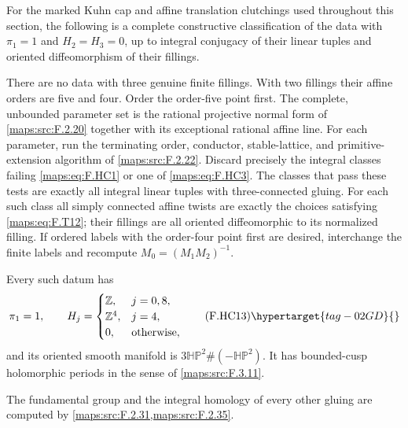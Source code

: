 \begin{corollary}\hypertarget{tag-02NL}{}\label{maps:src:F.2.30}


For the marked Kuhn cap and affine translation clutchings
used throughout this section, the following is a complete constructive
classification of the data with
$\pi_1=1$ and $H_2=H_3=0$, up to integral conjugacy of their
linear tuples and oriented diffeomorphism of their fillings.

There are no data with three genuine finite fillings.
With two fillings their affine orders are five and
four.  Order the order-five point first.
The complete, unbounded parameter set is the rational
projective normal form of \ref{maps:src:F.2.20} together with its
exceptional rational affine line.
For each parameter, run the terminating order,
conductor, stable-lattice, and primitive-extension algorithm
of \ref{maps:src:F.2.22}.  Discard precisely the integral classes failing
\eqref{maps:eq:F.HC1} or one of \eqref{maps:eq:F.HC3}.
The classes that pass these tests are exactly all
integral linear tuples with three-connected gluing.
For each such class all simply connected affine
twists are exactly the choices satisfying \eqref{maps:eq:F.T12};
their fillings are all oriented diffeomorphic to its
normalized filling.
If ordered labels with the order-four point first are
desired, interchange the finite labels and recompute
$M_0=(M_1M_2)^{-1}$.

Every such datum has
\[
 \pi_1=1,\qquad
 H_j=\begin{cases}
  \mathbb Z,&j=0,8,\\
  \mathbb Z^4,&j=4,\\
  0,&\text{otherwise},
 \end{cases}
 \tag{F.HC13}\hypertarget{tag-02GD}{}\label{maps:eq:F.HC13}
\]
and its oriented smooth manifold is
$3\mathbb{HP}^2\#(-\mathbb{HP}^2)$.
It has bounded-cusp holomorphic periods in the sense of \ref{maps:src:F.3.11}.

The fundamental group and the integral homology of every other gluing are computed by \cref{maps:src:F.2.31,maps:src:F.2.35}.

\end{corollary}


